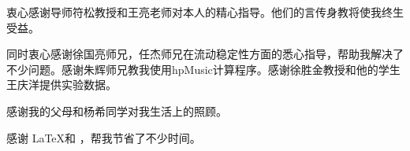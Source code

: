 \begin{acknowledgement}
  衷心感谢导师符松教授和王亮老师对本人的精心指导。他们的言传身教将使我终生受益。

  同时衷心感谢徐国亮师兄，任杰师兄在流动稳定性方面的悉心指导，帮助我解决了不少问题。感谢朱辉师兄教我使用hpMusic计算程序。感谢徐胜金教授和他的学生王庆洋提供实验数据。

  感谢我的父母和杨希同学对我生活上的照顾。
  
  感谢 \LaTeX 和 \thuthesis\cite{thuthesis}，帮我节省了不少时间。
\end{acknowledgement}

